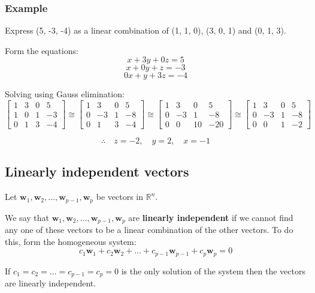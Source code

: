 \documentclass[11pt]{article}
\begin{document}
\subsubsection{Example}
\label{sec:org1425287}
Express (5, -3, -4) as a linear combination of (1, 1, 0), (3, 0, 1) and (0, 1, 3).


Form the equations:
\[x + 3y + 0z = 5\]
\[x + 0y + z = -3\]
\[0x + y + 3z = -4\]

Solving using Gauss elimination:
\begin{displaymath}
\begin{bmatrix}
1 & 3 & 0 & 5 \\
1 & 0 & 1 & -3 \\
0 & 1 & 3 & -4
\end{bmatrix} \cong \begin{bmatrix}
1 & 3 & 0 & 5 \\
0 & -3 & 1 & -8 \\
0 & 1 & 3 & -4
\end{bmatrix} \cong \begin{bmatrix}
1 & 3 & 0 & 5 \\
0 & -3 & 1 & -8 \\
0 & 0 & 10 & -20
\end{bmatrix} \cong \begin{bmatrix}
1 & 3 & 0 & 5 \\
0 & -3 & 1 & -8 \\
0 & 0 & 1 & -2
\end{bmatrix}
\end{displaymath}

\[\therefore \quad z = -2, \quad y = 2, \quad x = -1\]
\subsection{Linearly independent vectors}
\label{sec:org3007683}
Let \(\boldsymbol{w}_1, \boldsymbol{w}_2, \ldots, \boldsymbol{w}_{p-1}, \boldsymbol{w}_p\) be vectors in \(\mathbb{R}^n\).


We say that \(\boldsymbol{w}_1, \boldsymbol{w}_2, \ldots, \boldsymbol{w}_{p-1}, \boldsymbol{w}_p\) are \textbf{linearly independent} if we cannot find any one of these vectors to be a linear combination of the other vectors. To do this, form the homogeneous system:
\[c_1 \boldsymbol{w}_1 + c_2 \boldsymbol{w}_2 + \ldots + c_{p-1} \boldsymbol{w}_{p-1} + c_p \boldsymbol{w}_p = 0\]

If \(c_1 = c_2 = \ldots = c_{p-1} = c_p = 0\) is the only solution of the system then the vectors are linearly independent.
\end{document}
